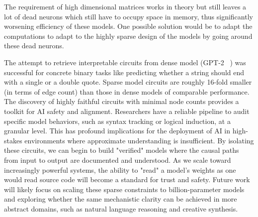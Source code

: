 \documentclass[a4paper,oneside,10pt,english]{scrartcl}
\begin{document}
The requirement of high dimensional matrices works in theory but still leaves a lot of dead neurons which still have to occupy space in memory, thus significantly worsening efficiency of these models. One possible solution would be to adapt the computations to adapt to the highly sparse design of the models by going around these dead neurons. \par
The attempt to retrieve interpretable circuits from dense model (GPT-2 ~\cite{radford2019language}) was successful for concrete binary tasks like predicting whether a string should end with a single or a double quote. Sparse model circuits are roughly 16-fold smaller (in terms of edge count) than those in dense models of comparable performance. The discovery of highly faithful circuits with minimal node counts provides a toolkit for AI safety and alignment. Researchers have a reliable pipeline to audit specific model behaviors, such as syntax tracking or logical induction, at a granular level. This has profound implications for the deployment of AI in high-stakes environments where approximate understanding is insufficient. By isolating these circuits, we can begin to build "verified" models where the causal paths from input to output are documented and understood. As we scale toward increasingly powerful systems, the ability to "read" a model’s weights as one would read source code will become a standard for trust and safety. Future work will likely focus on scaling these sparse constraints to billion-parameter models and exploring whether the same mechanistic clarity can be achieved in more abstract domains, such as natural language reasoning and creative synthesis.



\printbibliography

\appendix






\cleardoubleoddpage
\end{document}
